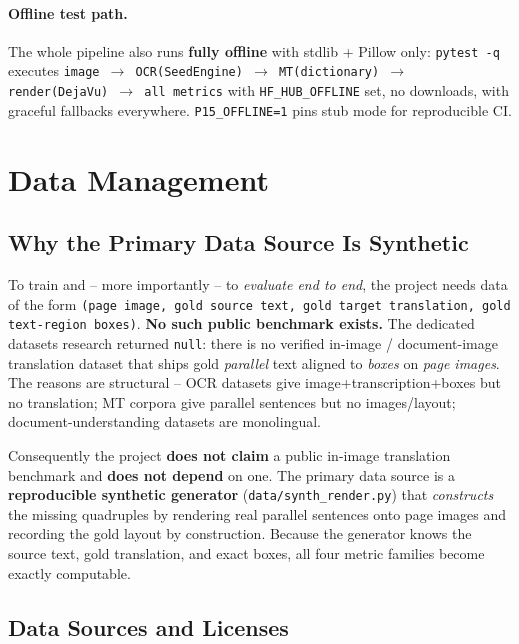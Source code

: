 \documentclass[12pt,a4paper]{article}
\begin{document}
\paragraph{Offline test path.} The whole pipeline also runs \textbf{fully offline} with stdlib + Pillow only: \texttt{pytest -q} executes \texttt{image $\rightarrow$ OCR(SeedEngine) $\rightarrow$ MT(dictionary) $\rightarrow$ render(DejaVu) $\rightarrow$ all metrics} with \texttt{HF\_HUB\_OFFLINE} set, no downloads, with graceful fallbacks everywhere. \texttt{P15\_OFFLINE=1} pins stub mode for reproducible CI.

\section{Data Management}

\subsection{Why the Primary Data Source Is Synthetic}

To train and -- more importantly -- to \emph{evaluate end to end}, the project needs data of the form \texttt{(page image, gold source text, gold target translation, gold text-region boxes)}. \textbf{No such public benchmark exists.} The dedicated datasets research returned \texttt{null}: there is no verified in-image / document-image translation dataset that ships gold \emph{parallel} text aligned to \emph{boxes} on \emph{page images}. The reasons are structural -- OCR datasets give image+transcription+boxes but no translation; MT corpora give parallel sentences but no images/layout; document-understanding datasets are monolingual.

Consequently the project \textbf{does not claim} a public in-image translation benchmark and \textbf{does not depend} on one. The primary data source is a \textbf{reproducible synthetic generator} (\texttt{data/synth\_render.py}) that \emph{constructs} the missing quadruples by rendering real parallel sentences onto page images and recording the gold layout by construction. Because the generator knows the source text, gold translation, and exact boxes, all four metric families become exactly computable.

\subsection{Data Sources and Licenses}
\end{document}
